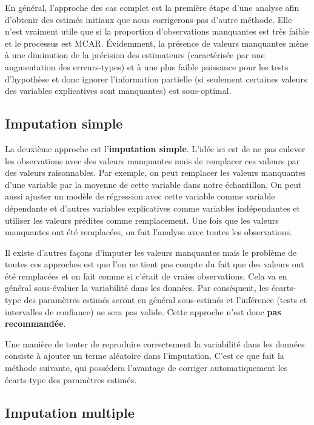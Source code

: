 \documentclass[
  11pt,
  letterpaper,
]{book}
\theoremstyle{definition}
\theoremstyle{definition}
\theoremstyle{definition}
\theoremstyle{definition}
\theoremstyle{remark}
\begin{document}
En général, l'approche des cas complet est la première étape d'une analyse afin d'obtenir des estimés initiaux que nous corrigerons pas d'autre méthode. Elle n'est vraiment utile que si la proportion d'observations manquantes est très faible et le processus est MCAR. Évidemment, la présence de valeurs manquantes mène à une diminution de la précision des estimateurs (caractérisée par une augmentation des erreurs-types) et à une plus faible puissance pour les tests d'hypothèse et donc ignorer l'information partielle (si seulement certaines valeurs des variables explicatives sont manquantes) est sous-optimal.

\hypertarget{imputation-simple}{%
\subsection{Imputation simple}\label{imputation-simple}}

La deuxième approche est l'\textbf{imputation simple}. L'idée ici est de ne pas enlever les observations avec des valeurs manquantes mais de remplacer ces valeurs par des valeurs raisonnables. Par exemple, on peut remplacer les valeurs manquantes d'une variable par la moyenne de cette variable dans notre échantillon. On peut aussi ajuster un modèle de régression avec cette variable comme variable dépendante et d'autres variables explicatives comme variables indépendantes et utiliser les valeurs prédites comme remplacement. Une fois que les valeurs manquantes ont été remplacées, on fait l'analyse avec toutes les observations.

Il existe d'autres façons d'imputer les valeurs manquantes mais le problème de toutes ces approches est que l'on ne tient pas compte du fait que des valeurs ont été remplacées et on fait comme si c'était de vraies observations. Cela va en général sous-évaluer la variabilité dans les données. Par conséquent, les écarts-type des paramètres estimés seront en général sous-estimés et l'inférence (tests et intervalles de confiance) ne sera pas valide.
Cette approche n'est donc \textbf{pas recommandée}.

Une manière de tenter de reproduire correctement la variabilité dans les données consiste à ajouter un terme aléatoire dans l'imputation. C'est ce que fait la méthode suivante, qui possédera l'avantage de corriger automatiquement les écarts-type des paramètres estimés.

\hypertarget{imputation-multiple}{%
\subsection{Imputation multiple}\label{imputation-multiple}}
\end{document}
